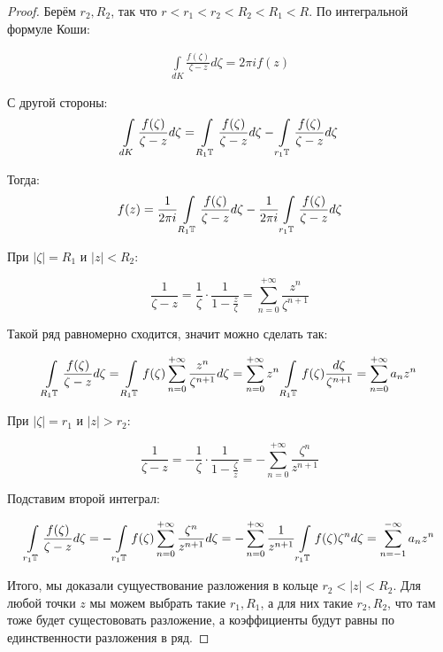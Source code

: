 \begin{proof}
    Берём $r_2, R_2$, так что $r < r_1 < r_2 < R_2 < R_1 < R$.
    По интегральной формуле Коши:

    \begin{gather*}
        \int\limits_{d K} \frac{f(\zeta)} {\zeta - z} d\zeta = 2 \pi i f(z)
    \end{gather*}

    С другой стороны: 
    \begin{gather*}
        \int\limits_{d K} \frac{f(\zeta)} {\zeta - z} d\zeta = \int\limits_{R_1\mathbb{T}} \frac{f(\zeta)}
        {\zeta - z} d\zeta - \int\limits_{r_1\mathbb{T}} \frac{f(\zeta)}{\zeta - z}d\zeta
    \end{gather*}

    Тогда: 
    \begin{gather*}
        f(z) = \frac{1}{2\pi i} \int\limits_{R_1\mathbb{T}} \frac{f(\zeta)}
        {\zeta - z} d\zeta - \frac{1}{2\pi i}
        \int\limits_{r_1\mathbb{T}} \frac{f(\zeta)}{\zeta - z}d\zeta
    \end{gather*}

    При $|\zeta| = R_1$ и $|z| < R_2$:

    \[
        \frac{1}{\zeta - z} =
        \frac{1}{\zeta}\cdot \frac{1}{1-\frac{z}{\zeta}}
        = \sum\limits_{n=0}^{+\infty} \frac{z^n}{\zeta^{n+1}}
    \]

    Такой ряд равномерно сходится, значит можно сделать так:

    \[
        \int\limits_{R_1\mathbb{T}} \frac{f(\zeta)}{\zeta - z}d\zeta =
        \int\limits_{R_1\mathbb{T}} f(\zeta) \sum\limits_{n=0}^{+\infty}
        \frac{z^n}{\zeta^{n+1}}d\zeta =
        \sum\limits_{n=0}^{+\infty} z^n
        \int\limits_{R_1\mathbb{T}} f(\zeta) \frac{d\zeta}{\zeta^{n+1}}
        = \sum\limits_{n=0}^{+\infty} a_nz^n
    \]

    При $|\zeta| = r_1$ и $|z| > r_2$:

    \[
        \frac{1}{\zeta - z} =
        -\frac{1}{\zeta}\cdot \frac{1}{1-\frac{\zeta}{z}}
        = -\sum\limits_{n=0}^{+\infty} \frac{\zeta^n}{z^{n+1}}
    \]

    Подставим второй интеграл:

    \[
        \int\limits_{r_1\mathbb{T}} \frac{f(\zeta)}{\zeta-z}d\zeta
        = -\int\limits_{r_1\mathbb{T}} f(\zeta) \sum\limits_{n=0}^{+\infty}
        \frac{\zeta^n}{z^{n+1}} d\zeta
        = -\sum\limits_{n=0}^{+\infty} \frac{1}{z^{n+1}}
        \int\limits_{r_1\mathbb{T}} f(\zeta)\zeta^n d\zeta
        = \sum\limits_{n=-1}^{-\infty} a_nz^n
    \]

    Итого, мы доказали сущуествование разложения в кольце $r_2 < |z| < R_2$. Для любой точки $z$ мы можем выбрать такие $r_1, R_1$, а для них такие $r_2, R_2$, что там тоже будет сущестововать разложение, а коэффициенты будут равны по единственности разложения в ряд.  
\end{proof}

